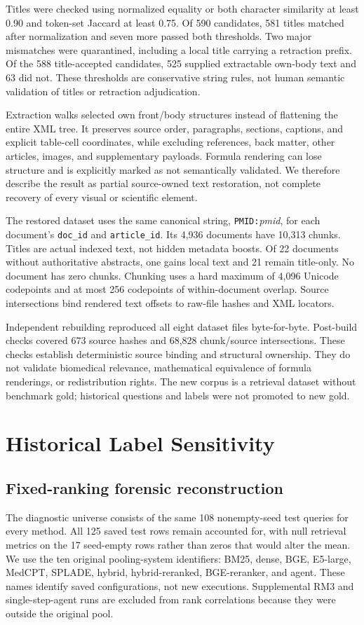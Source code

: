 \documentclass{article}
\begin{document}
Titles were checked using normalized equality or both character similarity at least 0.90 and token-set Jaccard at least 0.75. Of 590 candidates, 581 titles matched after normalization and seven more passed both thresholds. Two major mismatches were quarantined, including a local title carrying a retraction prefix. Of the 588 title-accepted candidates, 525 supplied extractable own-body text and 63 did not. These thresholds are conservative string rules, not human semantic validation of titles or retraction adjudication.

Extraction walks selected own front/body structures instead of flattening the entire XML tree. It preserves source order, paragraphs, sections, captions, and explicit table-cell coordinates, while excluding references, back matter, other articles, images, and supplementary payloads. Formula rendering can lose structure and is explicitly marked as not semantically validated. We therefore describe the result as partial source-owned text restoration, not complete recovery of every visual or scientific element.

The restored dataset uses the same canonical string, \texttt{PMID:}\emph{pmid}, for each document's \texttt{doc\_id} and \texttt{article\_id}. Its 4,936 documents have 10,313 chunks. Titles are actual indexed text, not hidden metadata boosts. Of 22 documents without authoritative abstracts, one gains local text and 21 remain title-only. No document has zero chunks. Chunking uses a hard maximum of 4,096 Unicode codepoints and at most 256 codepoints of within-document overlap. Source intersections bind rendered text offsets to raw-file hashes and XML locators.

Independent rebuilding reproduced all eight dataset files byte-for-byte. Post-build checks covered 673 source hashes and 68,828 chunk/source intersections. These checks establish deterministic source binding and structural ownership. They do not validate biomedical relevance, mathematical equivalence of formula renderings, or redistribution rights. The new corpus is a retrieval dataset without benchmark gold; historical questions and labels were not promoted to new gold.

\section{Historical Label Sensitivity}
\label{sec:labels}
\subsection{Fixed-ranking forensic reconstruction}
The diagnostic universe consists of the same 108 nonempty-seed test queries for every method. All 125 saved test rows remain accounted for, with null retrieval metrics on the 17 seed-empty rows rather than zeros that would alter the mean. We use the ten original pooling-system identifiers: BM25, dense, BGE, E5-large, MedCPT, SPLADE, hybrid, hybrid-reranked, BGE-reranker, and agent. These names identify saved configurations, not new executions. Supplemental RM3 and single-step-agent runs are excluded from rank correlations because they were outside the original pool.
\end{document}
